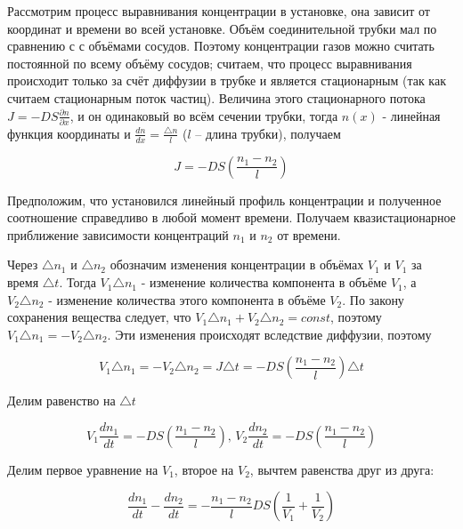 \documentclass[a4paper, 12pt]{article} %
\begin{document}
Рассмотрим процесс выравнивания концентрации в установке, она зависит от координат и времени во всей установке. Объём соединительной трубки мал по сравнению с с объёмами сосудов. Поэтому концентрации газов можно считать постоянной по всему объёму сосудов; считаем, что процесс выравнивания происходит только за счёт диффузии в трубке и является стационарным (так как считаем стационарным поток частиц). Величина этого стационарного потока $J = -DS\frac{\partial n}{\partial x}$, и он одинаковый во всём сечении трубки, тогда $n(x)$ - линейная функция координаты и $\frac{dn}{dx} = \frac{\triangle n}{l}$ ($l$ -- длина трубки), получаем 

\begin{equation}
    J = -DS \left( \frac{n_1-n_2}{l} \right)
\end{equation}

Предположим, что установился линейный профиль концентрации и полученное соотношение справедливо в любой момент времени. Получаем квазистационарное приближение зависимости концентраций $n_1$ и $n_2$ от времени.

Через $\triangle n_1$ и $\triangle n_2$ обозначим изменения концентрации в объёмах $V_1$ и $V_1$ за время $\triangle t$. Тогда $V_1 \triangle n_1$ - изменение количества компонента в объёме $V_1$, а $V_2 \triangle n_2$ - изменение количества этого компонента в объёме $V_2$. По закону сохранения вещества следует, что $V_1 \triangle n_1 + V_2 \triangle n_2 = const$, поэтому $V_1 \triangle n_1 = - V_2 \triangle n_2$. Эти изменения происходят вследствие диффузии, поэтому

\begin{equation}
    V_1 \triangle n_1 = - V_2 \triangle n_2 = J \triangle t = -DS   \left( \frac{n_1-n_2}{l} \right) \triangle t
\end{equation}

Делим равенство на $\triangle t$

\begin{equation}
    V_1 \frac{dn_1}{dt} = -DS \left( \frac{n_1-n_2}{l} \right) \text{, } V_2 \frac{dn_2}{dt} = -DS \left( \frac{n_1-n_2}{l}\right)
\end{equation}

Делим первое уравнение на $V_1$, второе на $V_2$, вычтем равенства друг из друга:

\begin{equation}
    \frac{dn_1}{dt}- \frac{dn_2}{dt} = - \frac{n_1-n_2}{l}DS \left( \frac{1}{V_1} +\frac{1}{V_2} \right)
\end{equation}
\end{document}
